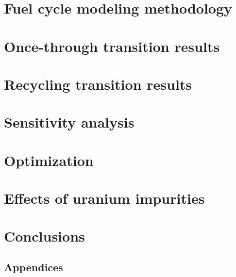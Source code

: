 \documentclass[edeposit,fullpage]{uiucthesis2018}
\begin{document}
\chapter{Fuel cycle modeling methodology} \label{ch:fc_methods}


\chapter{Once-through transition results} \label{ch:once_through_results}


\chapter{Recycling transition results} \label{ch:recycle_results}


\chapter{Sensitivity analysis} \label{ch:sa}

\chapter{Optimization}\label{ch:optimization}


\chapter{Effects of uranium impurities} \label{ch:neutronics}


\chapter{Conclusions} \label{ch:conclusions}


\begin{appendices}
\chapter*{Appendices}
\renewcommand{\thesection}{\Alph{section}}


\end{appendices}

\backmatter



\end{document}
